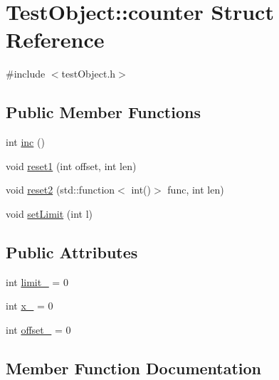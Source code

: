 \hypertarget{struct_test_object_1_1counter}{}\section{Test\+Object\+:\+:counter Struct Reference}
\label{struct_test_object_1_1counter}


{\ttfamily \#include $<$test\+Object.\+h$>$}

\subsection*{Public Member Functions}
\begin{DoxyCompactItemize}
\item 
int \hyperlink{struct_test_object_1_1counter_aa95d33e925b306b44d2f4644e6d6854d}{inc} ()
\item 
void \hyperlink{struct_test_object_1_1counter_a4d489fa56f4e27ba7199fb61e729e5dd}{reset1} (int offset, int len)
\item 
void \hyperlink{struct_test_object_1_1counter_a183f02106f687d82e854e40cc04f3dc1}{reset2} (std\+::function$<$ int()$>$ func, int len)
\item 
void \hyperlink{struct_test_object_1_1counter_ace630c8e0411208ee659367f78d7af42}{set\+Limit} (int l)
\end{DoxyCompactItemize}
\subsection*{Public Attributes}
\begin{DoxyCompactItemize}
\item 
int \hyperlink{struct_test_object_1_1counter_a052469155f47f7789f265202b8020994}{limit\+\_\+} = 0
\item 
int \hyperlink{struct_test_object_1_1counter_ad9102eca87642a332c0de6ffd3cd9552}{x\+\_\+} = 0
\item 
int \hyperlink{struct_test_object_1_1counter_ad3d69bfa0dfd1d4515bbef5c1b9f7c24}{offset\+\_\+} = 0
\end{DoxyCompactItemize}


\subsection{Member Function Documentation}
\hypertarget{struct_test_object_1_1counter_aa95d33e925b306b44d2f4644e6d6854d}{}
